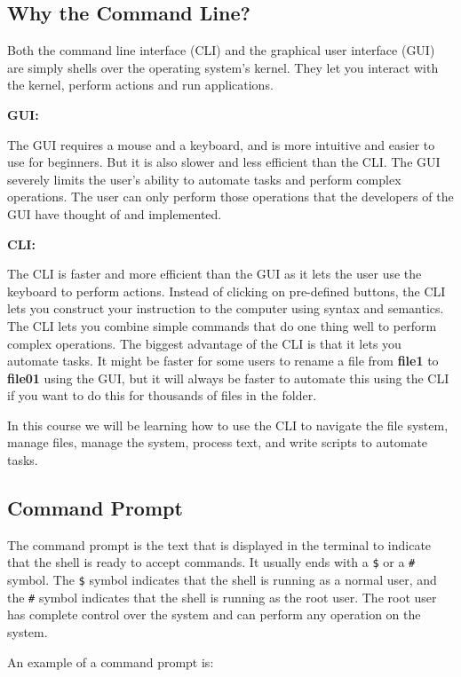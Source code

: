 \subsection{Why the Command Line?}

Both the command line interface (CLI) and the graphical user interface (GUI) are simply shells over the operating system's kernel.
They let you interact with the kernel, perform actions and run applications.

\textbf{GUI:}

The GUI requires a mouse and a keyboard, and is more intuitive and easier to use for beginners.
But it is also slower and less efficient than the CLI.
The GUI severely limits the user's ability to automate tasks and perform complex operations.
The user can only perform those operations that the developers of the GUI have thought of and implemented.

\textbf{CLI:}

The CLI is faster and more efficient than the GUI as it lets the user use the keyboard to perform actions.
Instead of clicking on pre-defined buttons, the CLI lets you construct your instruction to the computer using syntax and semantics.
The CLI lets you combine simple commands that do one thing well to perform complex operations.
The biggest advantage of the CLI is that it lets you automate tasks.
It might be faster for some users to rename a file from \textbf{file1} to \textbf{file01} using the GUI, but it will always be faster to automate this using the CLI if you want to do this for thousands of files in the folder.

In this course we will be learning how to use the CLI to navigate the file system, manage files, manage the system, process text, and write scripts to automate tasks.

\subsection{Command Prompt}

The command prompt is the text that is displayed in the terminal to indicate that the shell is ready to accept commands. It usually ends with a \texttt{\$} or a \texttt{\#} symbol. The \texttt{\$} symbol indicates that the shell is running as a normal user, and the \texttt{\#} symbol indicates that the shell is running as the root user. The root user has complete control over the system and can perform any operation on the system.

An example of a command prompt is:

